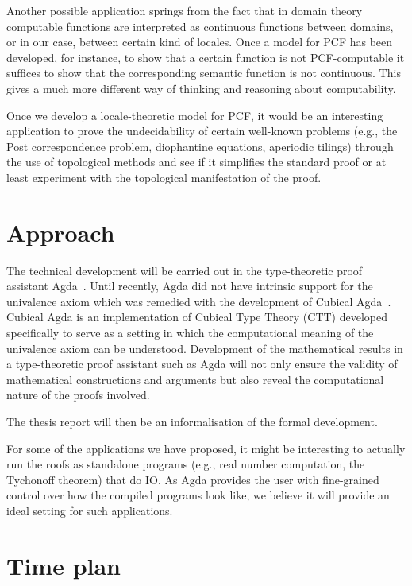 \documentclass{article}
\begin{document}
Another possible application springs from the fact that in domain theory computable
functions are interpreted as continuous functions between domains, or in our case, between
certain kind of locales. Once a model for PCF has been developed, for instance, to show
that a certain function is not PCF-computable it suffices to show that the corresponding
semantic function is not continuous. This gives a much more different way of thinking and
reasoning about computability.

Once we develop a locale-theoretic model for PCF, it would be an interesting application
to prove the undecidability of certain well-known problems (e.g., the Post correspondence
problem, diophantine equations, aperiodic tilings) through the use of topological methods
and see if it simplifies the standard proof or at least experiment with the topological
manifestation of the proof.

\section{Approach}

The technical development will be carried out in the type-theoretic proof assistant
Agda~\cite{norell:2008}. Until recently, Agda did not have intrinsic support for the
univalence axiom which was remedied with the development of Cubical
Agda~\cite{cubicalagda}. Cubical Agda is an implementation of Cubical Type Theory (CTT)
developed specifically to serve as a setting in which the computational meaning of the
univalence axiom can be understood. Development of the mathematical results in a
type-theoretic proof assistant such as Agda will not only ensure the validity of
mathematical constructions and arguments but also reveal the computational nature of the
proofs involved.

The thesis report will then be an informalisation of the formal development.

For some of the applications we have proposed, it might be interesting to actually run the
roofs as standalone programs (e.g., real number computation, the Tychonoff theorem) that
do IO. As Agda provides the user with fine-grained control over how the compiled programs
look like, we believe it will provide an ideal setting for such applications.

\section{Time plan}
\end{document}
